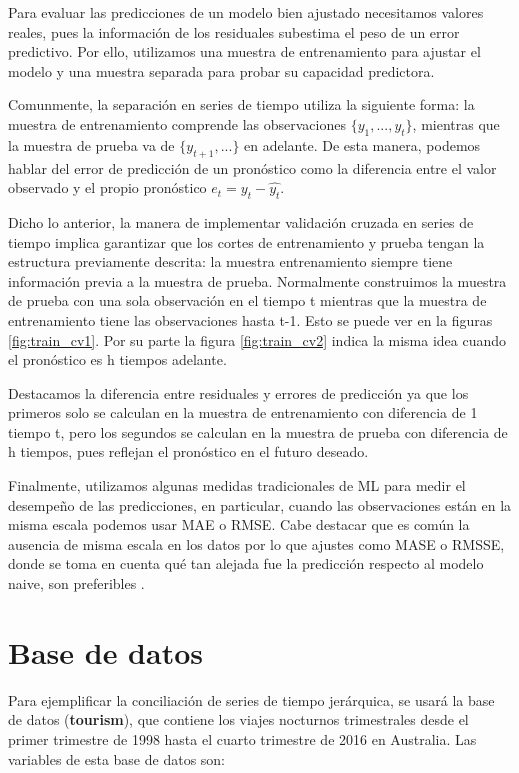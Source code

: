 Para evaluar las predicciones de un modelo bien ajustado necesitamos valores reales, pues la información de los residuales subestima el peso de un error predictivo. Por ello, utilizamos una muestra de entrenamiento para ajustar el modelo y una muestra separada para probar su capacidad predictora. 

Comunmente, la separación en series de tiempo utiliza la siguiente forma: la muestra de entrenamiento comprende las observaciones $\{y_1,...,y_t\}$, mientras que la muestra de prueba va de $\{y_{t+1}, ...\}$ en adelante. De esta manera, podemos hablar del error de predicción de un pronóstico como la diferencia entre el valor observado y el propio pronóstico $e_t = y_t - \hat{y_t}$. 

Dicho lo anterior, la manera de implementar validación cruzada en series de tiempo implica garantizar que los cortes de entrenamiento y prueba tengan la estructura previamente descrita: la muestra entrenamiento siempre tiene información previa a la muestra de prueba. Normalmente construimos la muestra de prueba con una sola observación en el tiempo t mientras que la muestra de entrenamiento tiene las observaciones hasta t-1. Esto se puede ver en la figuras \ref{fig:train_cv1}. Por su parte la figura \ref{fig:train_cv2} indica la misma idea cuando el pronóstico es h tiempos adelante.


Destacamos la diferencia entre residuales y errores de predicción ya que los primeros solo se calculan en la muestra de entrenamiento con diferencia de 1 tiempo t, pero los segundos se calculan en la muestra de prueba con diferencia de h tiempos, pues reflejan el pronóstico en el futuro deseado.

Finalmente, utilizamos algunas medidas tradicionales de ML para medir el desempeño de las predicciones, en particular, cuando las observaciones están en la misma escala podemos usar MAE o RMSE. Cabe destacar que es común la ausencia de misma escala en los datos por lo que ajustes como MASE o RMSSE, donde se toma en cuenta qué tan alejada fue la predicción respecto al modelo naive, son preferibles \cite{hyndman2018forecasting}.


\section{Base de datos}

Para ejemplificar la conciliación de series de tiempo jerárquica, se usará la base de datos (\textbf{tourism}), que  contiene los viajes nocturnos trimestrales desde el primer trimestre de 1998 hasta el cuarto trimestre de 2016 en Australia. Las variables de esta base de datos son:

